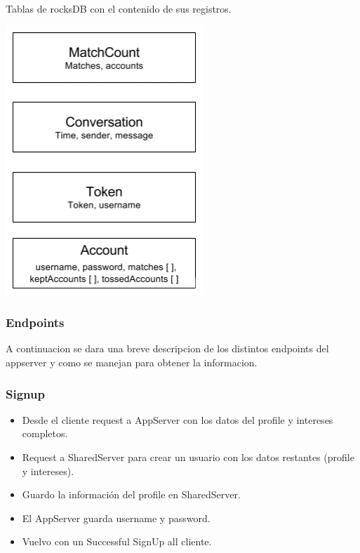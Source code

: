 \documentclass[letterpaper,10pt,english]{sphinxmanual}
\begin{document}
Tablas de rocksDB con el contenido de sus registros.

\includegraphics{rocksdb.png}


\subsubsection{Endpoints}
\label{manuals:endpoints}
A continuacion se dara una breve descripcion de los distintos endpoints del appserver y como se manejan para obtener la informacion.


\subsubsection{Signup}
\label{manuals:signup}\begin{itemize}
\item {} 
Desde el cliente request a AppServer con los datos del profile y intereses completos.

\item {} 
Request a SharedServer para crear un usuario con los datos restantes (profile y intereses).

\item {} 
Guardo la información del profile en SharedServer.

\item {} 
El AppServer guarda username y password.

\item {} 
Vuelvo con un Successful SignUp all cliente.

\end{itemize}
\end{document}

